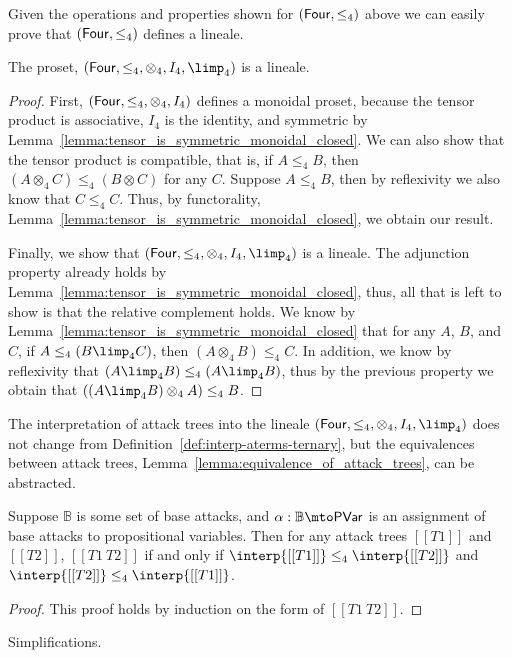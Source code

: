 Given the operations and properties shown for $(\mathsf{Four}, \leq_4)$ above
we can easily prove that $(\mathsf{Four}, \leq_4)$ defines a lineale.
\begin{lemma}
  \label{lemma:four_is_a_lineale}
  The proset, $(\Four, \leq_4, \otimes_4, I_4, \limp_4)$ is a lineale.
\end{lemma}
\begin{proof}
  First, $(\mathsf{Four}, \leq_4, \otimes_4, I_4)$ defines a monoidal proset,
  because the tensor product is associative, $I_4$ is the identity,
  and symmetric by
  Lemma~\ref{lemma:tensor_is_symmetric_monoidal_closed}.  We can also
  show that the tensor product is compatible, that is, if $A \leq_4
  B$, then $(A \otimes_4 C) \leq_4 (B \otimes C)$ for any $C$.
  Suppose $A \leq_4 B$, then by reflexivity we also know that $C
  \leq_4 C$.  Thus, by functorality,
  Lemma~\ref{lemma:tensor_is_symmetric_monoidal_closed}, we obtain our
  result.

  Finally, we show that $(\Four, \leq_4, \otimes_4, I_4, \limp_4)$ is
  a lineale.  The adjunction property already holds by
  Lemma~\ref{lemma:tensor_is_symmetric_monoidal_closed}, thus, all
  that is left to show is that the relative complement holds. We know
  by Lemma~\ref{lemma:tensor_is_symmetric_monoidal_closed} that for
  any $A$, $B$, and $C$, if $A \leq_4 (B \limp_4 C)$, then $(A
  \otimes_4 B) \leq_4 C$.  In addition, we know by reflexivity that
  $(A \limp_4 B) \leq_4 (A \limp_4 B)$, thus by the previous property we obtain
  that $((A \limp_4 B) \otimes_4 A) \leq_4 B$.
\end{proof}

The interpretation of attack trees into the lineale $(\Four, \leq_4,
\otimes_4, I_4, \limp_4)$ does not change from
Definition~\ref{def:interp-aterms-ternary}, but the equivalences
between attack trees, Lemma~\ref{lemma:equivalence_of_attack_trees},
can be abstracted.
\begin{lemma}
  \label{lemma:equivalence_of_attack_trees_lineale}
  Suppose $\mathbb{B}$ is some set of base attacks, and $\alpha :
  \mathbb{B} \mto \mathsf{PVar}$ is an assignment of base attacks to
  propositional variables.  Then for any attack trees $[[T1]]$ and
  $[[T2]]$, $[[T1 ~ T2]]$ if and only if $\interp{[[T1]]} \leq_4 \interp{[[T2]]}$ and
  $\interp{[[T2]]} \leq_4 \interp{[[T1]]}$.
\end{lemma}
\begin{proof}
  This proof holds by induction on the form of $[[T1 ~ T2]]$.
\end{proof}
Simplifications.
